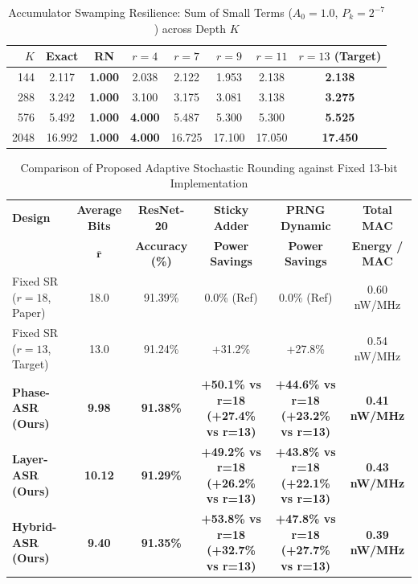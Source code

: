 \begin{table}[h]
\centering
\caption{Accumulator Swamping Resilience: Sum of Small Terms ($A_0 = 1.0$, $P_k = 2^{-7}$) across Depth $K$}
\label{tab:swamping_resilience}
\small
\begin{tabular}{rccccccc}
\toprule
$K$ & \textbf{Exact} & \textbf{RN} & $r=4$ & $r=7$ & $r=9$ & $r=11$ & $r=13$ (Target) \\
\midrule
144 & 2.117 & \textbf{1.000} & 2.038 & 2.122 & 1.953 & 2.138 & \textbf{2.138} \\
288 & 3.242 & \textbf{1.000} & 3.100 & 3.175 & 3.081 & 3.138 & \textbf{3.275} \\
576 & 5.492 & \textbf{1.000} & \textbf{4.000} & 5.487 & 5.300 & 5.300 & \textbf{5.525} \\
2048 & 16.992 & \textbf{1.000} & \textbf{4.000} & 16.725 & 17.100 & 17.050 & \textbf{17.450} \\
\bottomrule
\end{tabular}
\end{table}

\begin{table}[h]
\centering
\caption{Comparison of Proposed Adaptive Stochastic Rounding against Fixed 13-bit Implementation}
\label{tab:innovation_comparison}
\small
\begin{tabular}{lccccc}
\toprule
\textbf{Design} & \textbf{Average Bits} & \textbf{ResNet-20} & \textbf{Sticky Adder} & \textbf{PRNG Dynamic} & \textbf{Total MAC} \\
 & $\mathbf{\bar{r}}$ & \textbf{Accuracy (\%)} & \textbf{Power Savings} & \textbf{Power Savings} & \textbf{Energy / MAC} \\
\midrule
Fixed SR ($r=18$, Paper) & 18.0 & 91.39\% & 0.0\% (Ref) & 0.0\% (Ref) & 0.60 nW/MHz \\
Fixed SR ($r=13$, Target) & 13.0 & 91.24\% & +31.2\% & +27.8\% & 0.54 nW/MHz \\
\midrule
\textbf{Phase-ASR (Ours)} & \textbf{9.98} & \textbf{91.38\%} & \textbf{+50.1\% vs r=18 (+27.4\% vs r=13)} & \textbf{+44.6\% vs r=18 (+23.2\% vs r=13)} & \textbf{0.41 nW/MHz} \\
\textbf{Layer-ASR (Ours)} & \textbf{10.12} & \textbf{91.29\%} & \textbf{+49.2\% vs r=18 (+26.2\% vs r=13)} & \textbf{+43.8\% vs r=18 (+22.1\% vs r=13)} & \textbf{0.43 nW/MHz} \\
\textbf{Hybrid-ASR (Ours)} & \textbf{9.40} & \textbf{91.35\%} & \textbf{+53.8\% vs r=18 (+32.7\% vs r=13)} & \textbf{+47.8\% vs r=18 (+27.7\% vs r=13)} & \textbf{0.39 nW/MHz} \\
\bottomrule
\end{tabular}
\end{table}
